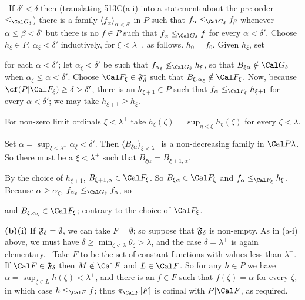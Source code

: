 { \Quer\ If $\delta'<\delta$ then (translating 513C(a-i)
into a statement about the pre-order
$\le_{\Cal G_{\delta}}$) there is a family
$\langle f_{\alpha}\rangle_{\alpha<\delta'}$ in $P$ such that
$f_{\alpha}\le_{\Cal G_{\delta}}f_{\beta}$ whenever
$\alpha\le\beta<\delta'$ but
there is no $f\in P$ such that $f_{\alpha}\le_{\Cal G_{\delta}}f$
for every $\alpha<\delta'$.   Choose $h_{\xi}\in P$,
$\alpha_{\xi}<\delta'$
inductively, for $\xi<\lambda^+$, as follows.  $h_0=f_0$.
Given $h_{\xi}$, set


\noindent for each $\alpha<\delta'$;  let
$\alpha_{\xi}<\delta'$ be such that
$f_{\alpha_{\xi}}\not\le_{\Cal G_{\delta}}h_{\xi}$,
so that $B_{\xi\alpha}\notin\Cal G_{\delta}$ when
$\alpha_{\xi}\le\alpha<\delta'$.   Choose
$\Cal F_{\xi}\in\frak F^*_{\delta}$ such that
$B_{\xi,\alpha_{\xi}}\notin\Cal F_{\xi}$.
Now, because $\cf(P|\Cal F_{\xi})\ge\delta>\delta'$, there
is an $h_{\xi+1}\in P$ such that $f_{\alpha}\le_{\Cal F_{\xi}}h_{\xi+1}$
for every $\alpha<\delta'$;  we may take $h_{\xi+1}\ge h_{\xi}$.

For non-zero limit ordinals $\xi<\lambda^+$ take
$h_{\xi}(\zeta)=\sup_{\eta<\xi}h_{\eta}(\zeta)$ for every
$\zeta<\lambda$.

Set $\alpha=\sup_{\xi<\lambda^+}\alpha_{\xi}<\delta'$.   Then
$\langle B_{\xi\alpha}\rangle_{\xi<\lambda^+}$ is a non-decreasing
family in $\Cal P\lambda$.   So there must be a $\xi<\lambda^+$ such
that $B_{\xi\alpha}=B_{\xi+1,\alpha}$.

By the choice of $h_{\xi+1}$, $B_{\xi+1,\alpha}\in\Cal F_{\xi}$.
So $B_{\xi\alpha}\in\Cal F_{\xi}$ and
$f_{\alpha}\le_{\Cal F_{\xi}}h_{\xi}$.   Because $\alpha\ge\alpha_{\xi}$,
$f_{\alpha_{\xi}}\le_{\Cal G_{\delta}}f_{\alpha}$, so


\noindent and $B_{\xi,\alpha_{\xi}}\in\Cal F_{\xi}$;  contrary to the
choice of $\Cal F_{\xi}$.\ \Bang

\medskip

{\bf (b)(i)}
If $\frak F_{\delta}=\emptyset$, we can take $F=\emptyset$;  so
suppose that $\frak F_{\delta}$ is non-empty.
As in (a-i) above, we must have
$\delta\ge\min_{\zeta<\lambda}\theta_{\zeta}>\lambda$, and the case
$\delta=\lambda^+$ is again elementary.   \Prf\ Take $F$ to be the set
of constant functions with values less than $\lambda^+$.   If
$\Cal F\in\frak F_{\delta}$ then $M\notin\Cal F$ and $L\in\Cal F$.
So for any $h\in P$ we have $\alpha=\sup_{\zeta\in L}h(\zeta)<\lambda^+$,
and there is an $f\in F$ such that $f(\zeta)=\alpha$ for every
$\zeta$, in which case $h\le_{\Cal F}f$;  thus $\pi_{\Cal F}[F]$ is cofinal
with $P|\Cal F$, as required.\ \Qed

}
